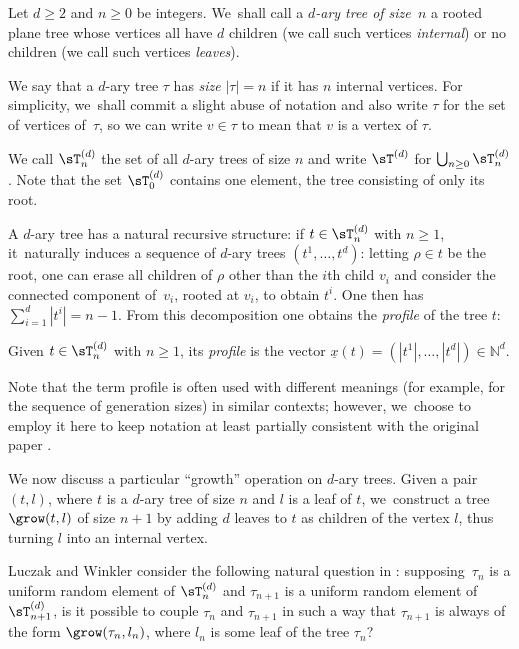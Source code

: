 
\begin{defn}\label{def:complete d-ary tree}
Let $d\!\geq\! 2$ and $n\!\geq\! 0$ be integers. We~shall call a \emph{$d$-ary tree of size~$n$} a rooted plane tree whose vertices all have $d$ children (we call such vertices \emph{internal}) or no children (we call such vertices \emph{leaves}).

We say that a $d$-ary tree $\tau$ has \emph{size} $|\tau|=n$ if it has $n$ internal vertices. For simplicity, we~shall commit a slight abuse of notation and also write $\tau$ for the set of vertices of~$\tau$, so we can write $v\in \tau$ to mean that $v$ is a vertex of $\tau$.

We call $\sT_n^{(d)}$ the set of all $d$-ary trees of size $n$ and write $\sT^{(d)}$ for $\bigcup_{n\geq 0}\sT_n^{(d)}$. Note that the set $\sT^{(d)}_0$ contains one element, the tree consisting of only its root.
\end{defn}

A $d$-ary tree has a natural recursive structure: if $t\in\sT_n^{(d)}$ with $n\geq 1$, it~naturally induces a sequence of $d$-ary trees $(t^1,\ldots, t^d)$: letting $\rho\in t$ be the root, one can erase all children of $\rho$ other than the $i$th child $v_i$ and consider the connected component of~$v_i$, rooted at $v_i$, to obtain $t^i$. One then has $\sum_{i=1}^d|t^i|=n-1$. From this decomposition one obtains the \emph{profile} of the tree $t$:

\begin{defn}
Given $t\in \sT_n^{(d)}$ with $n\geq 1$, its \emph{profile} is the vector $\underline{x}(t)=(|t^1|,\ldots,|t^d|)\in \mathbb{N}^d$.	
\end{defn}

Note that the term profile is often used with different meanings (for example, for the sequence of generation sizes) in similar contexts; however, we~choose to employ it here to keep notation at least partially consistent with the original paper \cite{LW04}.

We now discuss a particular ``growth'' operation on $d$-ary trees. Given a pair $(t,l)$, where $t$ is a $d$-ary tree of size $n$ and $l$ is a leaf of $t$, we~construct a tree $\grow(t,l)$ of size $n+1$ by adding $d$ leaves to $t$ as children of the vertex $l$, thus turning $l$ into an internal vertex.

Luczak and Winkler consider the following natural question in \cite{LW04}: supposing~$\tau_n$ is a uniform random element of $\sT^{(d)}_n$ and $\tau_{n+1}$ is a uniform random element of $\sT^{(d)}_{n+1}$, is it possible to couple $\tau_n$ and $\tau_{n+1}$ in such a way that $\tau_{n+1}$ is always of the form $\grow(\tau_n,l_n)$, where $l_n$ is some leaf of the tree $\tau_n$?

